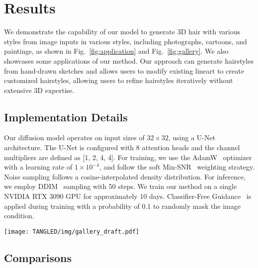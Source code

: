 \section{Results}
\label{sec:experiments}

We demonstrate the capability of our model to generate 3D hair with various styles from image inputs in various styles, including photographs, cartoons, and paintings, as shown in Fig.~\ref{fig:application} and Fig.~\ref{fig:gallery}. We also showcases some applications of our method. Our approach can generate hairstyles from hand-drawn sketches and allows users to modify existing lineart to create customized hairstyles, allowing users to refine hairstyles iteratively without extensive 3D expertise.


\subsection{Implementation Details}

Our diffusion model operates on input sizes of $32 \times 32$, using a U-Net~\cite{ronneberger2015u} architecture. The U-Net is configured with 8 attention heads and the channel multipliers are defined as [1, 2, 4, 4]. For training, we use the AdamW~\cite{loshchilov2017decoupled} optimizer with a learning rate of $1 \times 10^{-4}$, and follow the soft Min-SNR~\cite{hang2023efficient} weighting strategy. Noise sampling follows a cosine-interpolated density distribution. For inference, we employ DDIM~\cite{song2020denoising} sampling with 50 steps. We train our method on a single NVIDIA RTX 3090 GPU for approximately 10 days. Classifier-Free Guidance~\cite{ho2022classifier} is applied during training with a probability of 0.1 to randomly mask the image condition.

\begin{figure*}
  \texttt{[image: TANGLED/img/gallery\_draft.pdf]}
  \label{fig:results_gallery}
  \caption{\textbf{Result gallery.} \myname can generate realistic hairstyles from image conditions with various styles, including photographs, anime, and oil paintings. For more results, please refer to the supplementary video. Note that we manually specified the color for the generated hair during the rendering process.}
  \label{fig:gallery}
\end{figure*}

\subsection{Comparisons}

